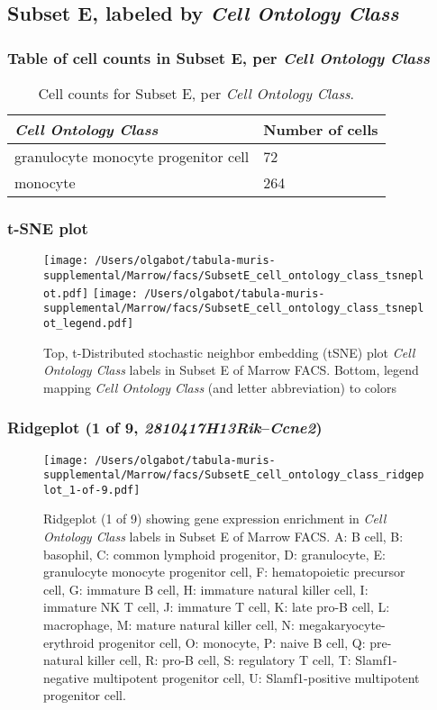 \subsection{Subset E, labeled by \emph{Cell Ontology Class}}
\subsubsection{Table of cell counts in Subset E, per \emph{Cell Ontology Class}}\begin{table}[h]
\centering
\label{my-label}
\begin{tabular}{@{}ll@{}}
\toprule

\emph{Cell Ontology Class}& Number of cells \\ \midrule
granulocyte monocyte progenitor cell & 72 \\

monocyte & 264 \\
\bottomrule
\end{tabular}
\caption{Cell counts for Subset E, per \emph{Cell Ontology Class}.}
\end{table}

\clearpage
\subsubsection{t-SNE plot}
\begin{figure}[h]
\centering
\texttt{[image: /Users/olgabot/tabula-muris-supplemental/Marrow/facs/SubsetE\_cell\_ontology\_class\_tsneplot.pdf]}
\texttt{[image: /Users/olgabot/tabula-muris-supplemental/Marrow/facs/SubsetE\_cell\_ontology\_class\_tsneplot\_legend.pdf]}
\caption{Top, t-Distributed stochastic neighbor embedding (tSNE) plot  \emph{Cell Ontology Class} labels in Subset E of Marrow FACS. Bottom, legend mapping \emph{Cell Ontology Class} (and letter abbreviation) to colors}
\end{figure}


\clearpage

\subsubsection{Ridgeplot (1 of 9, \emph{2810417H13Rik}--\emph{Ccne2})}
\begin{figure}[h]
\centering
\texttt{[image: /Users/olgabot/tabula-muris-supplemental/Marrow/facs/SubsetE\_cell\_ontology\_class\_ridgeplot\_1-of-9.pdf]}

\caption{ Ridgeplot (1 of 9)  showing gene expression enrichment in \emph{Cell Ontology Class} labels in Subset E of Marrow FACS. A: B cell, B: basophil, C: common lymphoid progenitor, D: granulocyte, E: granulocyte monocyte progenitor cell, F: hematopoietic precursor cell, G: immature B cell, H: immature natural killer cell, I: immature NK T cell, J: immature T cell, K: late pro-B cell, L: macrophage, M: mature natural killer cell, N: megakaryocyte-erythroid progenitor cell, O: monocyte, P: naive B cell, Q: pre-natural killer cell, R: pro-B cell, S: regulatory T cell, T: Slamf1-negative multipotent progenitor cell, U: Slamf1-positive multipotent progenitor cell.}
\end{figure}


